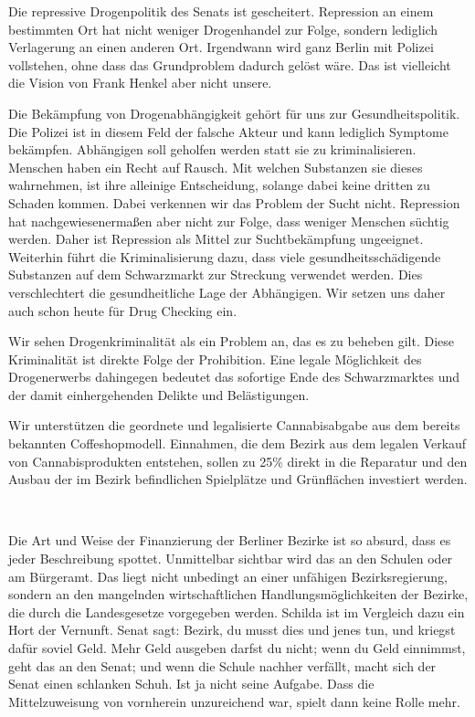 \documentclass[a4paper,10pt]{article}
\newcommand{\mysection}[1]{{\vspace{1cm}\noindent\color{gray}{\ttfamily\LARGE\raggedright #1}\\\medskip}}
\newcommand{\abschnitt}[2]{%
\mysection{\raggedright #1}%
\begin{figure}[t]%
\vspace*{-2.7cm}%
\hspace*{-2.1cm}%
\texttt{[image: images/blog/small/\#2]} %
\end{figure}%
}
\begin{document}
Die repressive Drogenpolitik des Senats ist gescheitert. Repression an
einem bestimmten Ort hat nicht weniger Drogenhandel zur Folge, sondern
lediglich Verlagerung an einen anderen Ort. Irgendwann wird ganz Berlin
mit Polizei vollstehen, ohne dass das Grundproblem dadurch gelöst wäre.
Das ist vielleicht die Vision von Frank Henkel aber nicht unsere.

Die Bekämpfung von Drogenabhängigkeit gehört für uns zur
Gesundheitspolitik. Die Polizei ist in diesem Feld der falsche Akteur
und kann lediglich Symptome bekämpfen. Abhängigen soll geholfen werden
statt sie zu kriminalisieren. Menschen haben ein Recht auf Rausch. Mit
welchen Substanzen sie dieses wahrnehmen, ist ihre alleinige
Entscheidung, solange dabei keine dritten zu Schaden kommen. Dabei
verkennen wir das Problem der Sucht nicht. Repression hat
nachgewiesenermaßen aber nicht zur Folge, dass weniger Menschen süchtig
werden. Daher ist Repression als Mittel zur Suchtbekämpfung ungeeignet.
Weiterhin führt die Kriminalisierung dazu, dass viele
gesundheitsschädigende Substanzen auf dem Schwarzmarkt zur Streckung
verwendet werden. Dies verschlechtert die gesundheitliche Lage der
Abhängigen. Wir setzen uns daher auch schon heute für Drug Checking ein.

Wir sehen Drogenkriminalität als ein Problem an, das es zu beheben gilt.
Diese Kriminalität ist direkte Folge der Prohibition. Eine legale
Möglichkeit des Drogenerwerbs dahingegen bedeutet das sofortige Ende des
Schwarzmarktes und der damit einhergehenden Delikte und Belästigungen.

Wir unterstützen die geordnete und legalisierte Cannabisabgabe aus dem
bereits bekannten Coffeshopmodell. Einnahmen, die dem Bezirk aus dem
legalen Verkauf von Cannabisprodukten entstehen, sollen zu 25\% direkt
in die Reparatur und den Ausbau der im Bezirk befindlichen Spielplätze
und Grünflächen investiert werden.

\mysection{Finanzen}

Die Art und Weise der Finanzierung der Berliner Bezirke ist so absurd,
dass es jeder Beschreibung spottet. Unmittelbar sichtbar wird das an den
Schulen oder am Bürgeramt. Das liegt nicht unbedingt an einer unfähigen
Bezirksregierung, sondern an den mangelnden wirtschaftlichen
Handlungsmöglichkeiten der Bezirke, die durch die Landesgesetze
vorgegeben werden. Schilda ist im Vergleich dazu ein Hort der Vernunft.
Senat sagt: Bezirk, du musst dies und jenes tun, und kriegst dafür
soviel Geld. Mehr Geld ausgeben darfst du nicht; wenn du Geld einnimmst,
geht das an den Senat; und wenn die Schule nachher verfällt, macht sich
der Senat einen schlanken Schuh. Ist ja nicht seine Aufgabe. Dass die
Mittelzuweisung von vornherein unzureichend war, spielt dann keine Rolle
mehr.
\end{document}
